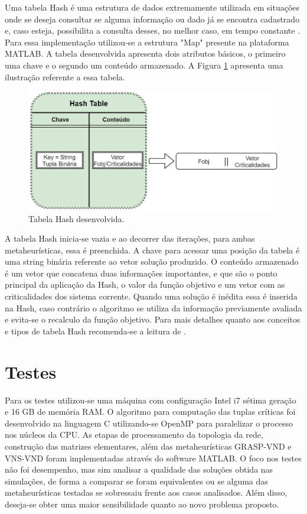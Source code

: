 \documentclass[12pt]{article}
\begin{document}
Uma tabela Hash é uma estrutura de dados extremamente utilizada em situações onde se deseja consultar se alguma informação ou dado já se encontra cadastrado e, caso esteja, possibilita a consulta desses, no melhor caso, em tempo constante \cite{Cormen}. Para essa implementação utilizou-se a estrutura "Map" presente na plataforma MATLAB\textregistered. A tabela desenvolvida apresenta dois atributos básicos, o primeiro uma chave e o segundo  um conteúdo armazenado. A Figura \ref{fig11} apresenta uma ilustração referente a essa tabela.

\begin{figure}[H]
	\centering 
	\includegraphics[scale=0.7]{figuras/Hash_table.jpg}
	\caption{Tabela Hash desenvolvida.}
	\label{fig11} %
\end{figure}

A tabela Hash inicia-se vazia e ao decorrer das iterações, para ambas metaheurísticas, essa é preenchida. A chave para acessar uma posição da tabela é uma string binária referente ao vetor solução produzido. O conteúdo armazenado é um vetor que concatena duas informações importantes, e que são o ponto principal da aplicação da Hash, o valor da função objetivo e um vetor com as criticalidades dos sistema corrente. Quando uma solução é inédita essa é inserida na Hash, caso contrário o algoritmo se utiliza da informação previamente avaliada e evita-se o recalculo da função objetivo. Para mais detalhes quanto aos conceitos e tipos de tabela Hash recomenda-se a leitura de \cite{Cormen}.

\section{Testes}

Para os testes utilizou-se uma máquina com configuração Intel i7 sétima geração e 16 GB de memória RAM. O algoritmo para computação das tuplas críticas foi desenvolvido na linguagem C utilizando-se OpenMP para paralelizar o processo nos núcleos da CPU. As etapas de processamento da topologia da rede, construção das matrizes elementares, além das metaheurísticas GRASP-VND e VNS-VND foram implementadas através do software MATLAB\textregistered. O foco nos testes não foi desempenho, mas sim analisar a qualidade das soluções obtida nas simulações, de forma a comparar se foram equivalentes ou se alguma das metaheurísticas testadas se sobressaiu frente aos casos analisados. Além disso, deseja-se obter uma maior sensibilidade quanto ao novo problema proposto.
\end{document}
